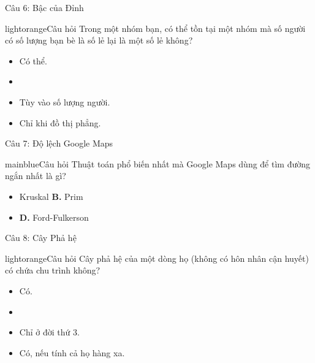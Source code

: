 \documentclass[10pt, xcolor={dvipsnames}]{beamer}
\begin{document}
\begin{frame}{Câu 6: Bậc của Đỉnh}
    \begin{gamebox}{lightorange}{Câu hỏi}
        Trong một nhóm bạn, có thể tồn tại một nhóm mà số người có số lượng bạn bè là số lẻ lại là một số lẻ không?
    \end{gamebox}
    \begin{itemize}
        \item[\textbf{A.}] Có thể.
        \item[\textbf{B.}] 
        \item[\textbf{C.}] Tùy vào số lượng người.
        \item[\textbf{D.}] Chỉ khi đồ thị phẳng.
    \end{itemize}
\end{frame}

\begin{frame}{Câu 7: Độ lệch Google Maps}
    \begin{gamebox}{mainblue}{Câu hỏi}
        Thuật toán phổ biến nhất mà Google Maps dùng để tìm đường ngắn nhất là gì?
    \end{gamebox}
    \begin{itemize}
        \item[\textbf{A.}] Kruskal \quad \quad \quad \quad \textbf{B.} Prim
        \item[\textbf{C.}]  \quad \textbf{D.} Ford-Fulkerson
    \end{itemize}
\end{frame}

\begin{frame}{Câu 8: Cây Phả hệ}
    \begin{gamebox}{lightorange}{Câu hỏi}
        Cây phả hệ của một dòng họ (không có hôn nhân cận huyết) có chứa chu trình không?
    \end{gamebox}
    \begin{itemize}
        \item[\textbf{A.}] Có.
        \item[\textbf{B.}] 
        \item[\textbf{C.}] Chỉ ở đời thứ 3.
        \item[\textbf{D.}] Có, nếu tính cả họ hàng xa.
    \end{itemize}
\end{frame}
\end{document}
